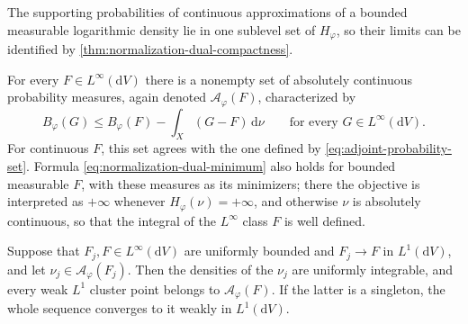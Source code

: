 The supporting probabilities of continuous approximations of a bounded measurable logarithmic density lie in one sublevel set of $H_\varphi$, so their limits can be identified by \cref{thm:normalization-dual-compactness}.

\begin{theorem}\label{thm:normalization-measurable-adjoint}
For every $F\in L^\infty(\mathrm{d}V)$ there is a nonempty set of absolutely continuous probability measures, again denoted $\mathcal A_\varphi(F)$, characterized by
\begin{equation}\label{eq:measurable-adjoint-support}
 B_\varphi(G)\leq B_\varphi(F)-\int_X(G-F)\,\mathrm{d}\nu
 \qquad\text{for every }G\in L^\infty(\mathrm{d}V).
\end{equation}
For continuous $F$, this set agrees with the one defined by \eqref{eq:adjoint-probability-set}. Formula \eqref{eq:normalization-dual-minimum} also holds for bounded measurable $F$, with these measures as its minimizers; there the objective is interpreted as $+\infty$ whenever $H_\varphi(\nu)=+\infty$, and otherwise $\nu$ is absolutely continuous, so that the integral of the $L^\infty$ class $F$ is well defined.

Suppose that $F_j,F\in L^\infty(\mathrm{d}V)$ are uniformly bounded and $F_j\to F$ in $L^1(\mathrm{d}V)$, and let $\nu_j\in\mathcal A_\varphi(F_j)$. Then the densities of the $\nu_j$ are uniformly integrable, and every weak $L^1$ cluster point belongs to $\mathcal A_\varphi(F)$. If the latter is a singleton, the whole sequence converges to it weakly in $L^1(\mathrm{d}V)$.
\end{theorem}
